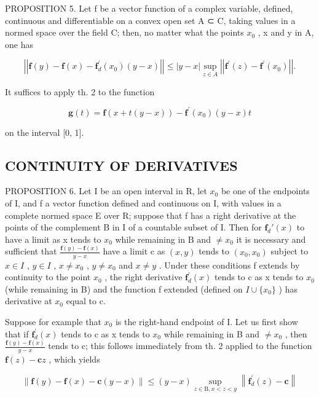 PROPOSITION 5. Let f be a vector function of a complex variable, defined, continuous and differentiable on a convex open set A ⊂ C, taking values in a normed space over the field C; then, no matter what the points \(x_{0}\) , x and y in A, one has

\[
\left| \left| \mathbf {f} (y) - \mathbf {f} (x) - \mathbf {f} _ {d} ^ {\prime} (x _ {0}) (y - x) \right| \right| \leqslant | y - x | \sup _ {z \in A} \left| \left| \mathbf {f} ^ {\prime} (z) - \mathbf {f} ^ {\prime} (x _ {0}) \right| \right|.\tag{10}
\]

It suffices to apply th. 2 to the function

\[
\mathbf {g} (t) = \mathbf {f} (x + t (y - x)) - \mathbf {f} ^ {\prime} (x _ {0}) (y - x) t
\]

on the interval {[}0, 1{]}.

\subsection{CONTINUITY OF DERIVATIVES}

PROPOSITION 6. Let I be an open interval in R, let \(x_0\) be one of the endpoints of I, and f a vector function defined and continuous on I, with values in a complete normed space E over R; suppose that f has a right derivative at the points of the complement B in I of a countable subset of I. Then for \(\mathbf{f}_d'(x)\) to have a limit as x tends to \(x_0\) while remaining in B and \(\neq x_0\) it is necessary and sufficient that \(\frac{\mathbf{f}(y) - \mathbf{f}(x)}{y - x}\) have a limit c as \((x, y)\) tends to \((x_0, x_0)\) subject to \(x \in I\) , \(y \in I\) , \(x \neq x_0\) , \(y \neq x_0\) and \(x \neq y\) . Under these conditions f extends by continuity to the point \(x_0\) , the right derivative \(\mathbf{f}_{d}^{\prime}(x)\) tends to c as x tends to \(x_{0}\) (while remaining in B) and the function f extended (defined on \(I \cup \{x_{0}\}\) ) has derivative at \(x_{0}\) equal to c.

Suppose for example that \(x_{0}\) is the right-hand endpoint of I. Let us first show that if \(\mathbf{f}_{d}^{\prime}(x)\) tends to c as x tends to \(x_{0}\) while remaining in B and \(\neq x_{0}\) , then \(\frac{\mathbf{f}(y)-\mathbf{f}(x)}{y-x}\) tends to c; this follows immediately from th. 2 applied to the function \(\mathbf{f}(z)-\mathbf{c}z\) , which yields

\[
\| \mathbf {f} (y) - \mathbf {f} (x) - \mathbf {c} (y - x) \| \leqslant (y - x) \sup _ {z \in \mathrm{B}, x <   z <   y} \left\| \mathbf {f} _ {d} ^ {\prime} (z) - \mathbf {c} \right\|
\]

